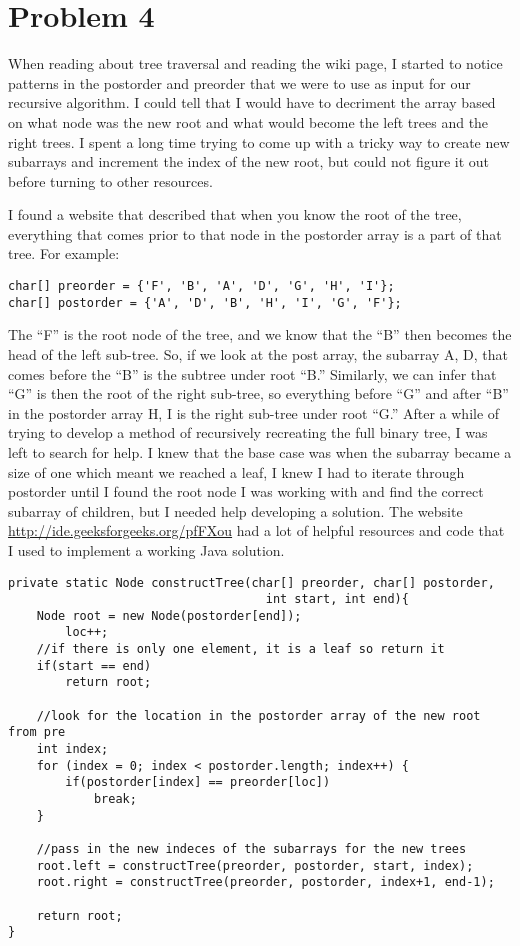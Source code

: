 \documentclass[10pt, draftclsnofoot, onecolumn]{IEEEtran}
\begin{document}
\newpage
\section{Problem 4}

When reading about tree traversal and reading the wiki page, I started to notice patterns in the postorder and preorder that we were to use as input for our recursive algorithm. I could tell that I would have to decriment the array based on what node was the new root and what would become the left trees and the right trees. I spent a long time trying to come up with a tricky way to create new subarrays and increment the index of the new root, but could not figure it out before turning to other resources. 

I found a website that described that when you know the root of the tree, everything that comes prior to that node in the postorder array is a part of that tree. For example:

\begin{lstlisting}
char[] preorder = {'F', 'B', 'A', 'D', 'G', 'H', 'I'};
char[] postorder = {'A', 'D', 'B', 'H', 'I', 'G', 'F'};
\end{lstlisting}
The ``F'' is the root node of the tree, and we know that the ``B'' then becomes the head of the left sub-tree. So, if we look at the post array, the subarray {A, D,} that comes before the ``B'' is the subtree under root ``B.'' Similarly, we can infer that ``G'' is then the root of the right sub-tree, so everything before ``G'' and after ``B'' in the postorder array {H, I} is the right sub-tree under root ``G.'' After a while of trying to develop a method of recursively recreating the full binary tree, I was left to search for help. I knew that the base case was when the subarray became a size of one which meant we reached a leaf, I knew I had to iterate through postorder until I found the root node I was working with and find the correct subarray of children, but I needed help developing a solution. The website \url{http://ide.geeksforgeeks.org/pfFXou} had a lot of helpful resources and code that I used to implement a working Java solution.\\


\begin{lstlisting}
private static Node constructTree(char[] preorder, char[] postorder, 
                                    int start, int end){
    Node root = new Node(postorder[end]);
        loc++; 
    //if there is only one element, it is a leaf so return it    
    if(start == end)      
        return root;    
    
    //look for the location in the postorder array of the new root from pre
    int index;
    for (index = 0; index < postorder.length; index++) {
        if(postorder[index] == preorder[loc])
            break;
    }
    
    //pass in the new indeces of the subarrays for the new trees
    root.left = constructTree(preorder, postorder, start, index);
    root.right = constructTree(preorder, postorder, index+1, end-1);
    
    return root;
}
\end{lstlisting}
\end{document}
